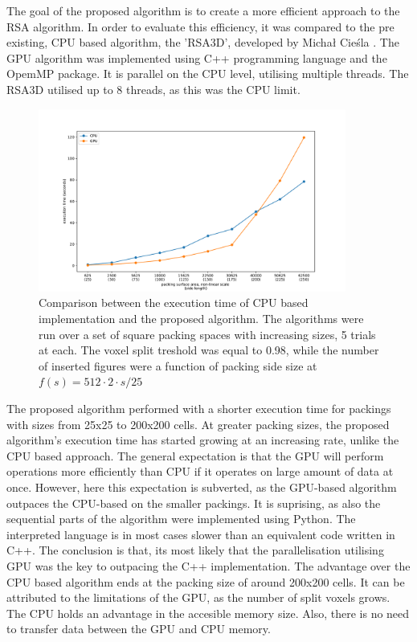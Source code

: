 \documentclass[12pt, oneside]{report}
\begin{document}
The goal of the proposed algorithm is to create a more efficient approach to the RSA algorithm. In order to evaluate this efficiency, it was compared to the pre existing, CPU based algorithm, the 'RSA3D', developed by Michał Cieśla \cite{ciesla}. The GPU algorithm was implemented using C++ programming language and the OpemMP package. It is parallel on the CPU level, utilising multiple threads. The RSA3D utilised up to 8 threads, as this was the CPU limit. \newline


\begin{figure}[H]
  \centering
	\includegraphics[width=0.9\textwidth,keepaspectratio]{Images/SummaryComparison/basic_comparison.pdf}
	\caption{Comparison between the execution time of CPU based implementation and the proposed algorithm. The algorithms were run over a set of square packing spaces with increasing sizes, 5 trials at each. The voxel split treshold was equal to 0.98, while the number of inserted figures were a function of packing side size at $f(s) = 512 \cdot 2 \cdot s/25 $ }
	\label{summary_comparison}
\end{figure}

The proposed algorithm performed with a shorter execution time for packings with sizes from 25x25 to 200x200 cells. At greater packing sizes, the proposed algorithm's execution time has started growing at an increasing rate, unlike the CPU based approach. \newline
The general expectation is that the GPU will perform operations more efficiently than CPU if it operates on large amount of data at once. However, here this expectation is subverted, as the GPU-based algorithm outpaces the CPU-based on the smaller packings. It is suprising, as also the sequential parts of the algorithm were implemented using Python. The interpreted language is in most cases slower than an equivalent code written in C++. The conclusion is that, its most likely that the parallelisation utilising GPU was the key to outpacing the C++ implementation.\newline
The advantage over the CPU based algorithm ends at the packing size of around 200x200 cells. It can be attributed to the limitations of the GPU, as the number of split voxels grows. The CPU holds an advantage in the accesible memory size. Also, there is no need to transfer data between the GPU and CPU memory.
\end{document}
